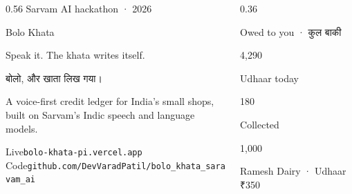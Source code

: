 \documentclass[aspectratio=169,10pt]{beamer}
\newcommand{\rs}{{\deva ₹}}
\begin{document}
\begin{frame}[plain]
  \vspace*{1.2cm}
  \begin{columns}[T]
    \begin{column}{0.56\textwidth}
      {\color{muted}\small Sarvam AI hackathon · 2026}\par\vspace{6pt}
      {\semibold\fontsize{40}{44}\selectfont Bolo Khata}\par\vspace{8pt}
      {\Large Speak it. The khata writes itself.}\par\vspace{4pt}
      {\deva\large\color{muted} बोलो, और खाता लिख गया।}\par\vspace{18pt}
      {\small A voice-first credit ledger for India's small shops,\\ built on Sarvam's Indic speech and language models.}\par\vspace{18pt}
      {\scriptsize\color{muted}
      Live\enspace\texttt{bolo-khata-pi.vercel.app}\\[2pt]
      Code\enspace\texttt{github.com/DevVaradPatil/bolo\_khata\_saravam\_ai}}
    \end{column}
    \begin{column}{0.36\textwidth}
      \begin{inkcard}
        {\footnotesize\color{paper!70} Owed to you · {\deva कुल बाकी}}\par
        {\semibold\fontsize{28}{30}\selectfont \rs4,290}\par\vspace{6pt}
        \begin{tcbraster}[raster columns=2,raster equal height,raster column skip=5pt]
          \begin{tcolorbox}[colback=paper!12!ink,colframe=paper!12!ink,arc=6pt,left=5pt,right=5pt,top=3pt,bottom=3pt]
            {\tiny\color{paper!70} Udhaar today}\par{\semibold\color{amberlite}\rs180}
          \end{tcolorbox}
          \begin{tcolorbox}[colback=paper!12!ink,colframe=paper!12!ink,arc=6pt,left=5pt,right=5pt,top=3pt,bottom=3pt]
            {\tiny\color{paper!70} Collected}\par{\semibold\color{greenlite}\rs1,000}
          \end{tcolorbox}
        \end{tcbraster}
      \end{inkcard}
      \vspace{-2pt}
      \begin{creditcard}
        {\footnotesize\semibold Ramesh Dairy · Udhaar \hfill \rs350}
      \end{creditcard}
    \end{column}
  \end{columns}
\end{frame}
\end{document}
